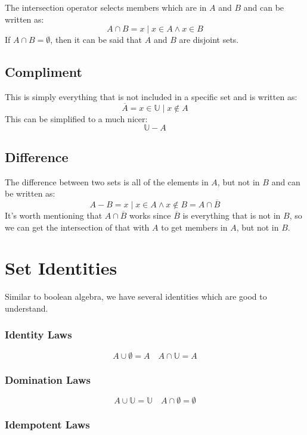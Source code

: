 The intersection operator selects members which are in \(A\) and \(B\) and can be written as:
\[
    A \cap B = {x \mid x \in A \land x \in B}
\]
If \(A \cap B= \emptyset\), then it can be said that \(A\) and \(B\) are disjoint sets.

\subsection{Compliment}\label{sub:compliment}

This is simply everything that is not included in a specific set and is written as:
\[
    \overline{A}={x \in \mathbb{U} \mid x \notin A}
\]
This can be simplified to a much nicer:
\[
    \mathbb{U}-A
\]

\subsection{Difference}\label{sub:differencepafour}

The difference between two sets is all of the elements in \(A\), but not in \(B\) and can be written as:
\[
    A-B = {x \mid x \in A \land x \notin B} = A \cap \overline{B}
\]
It's worth mentioning that \(A \cap \overline{B}\) works since \(\overline{B}\) is everything that is not in \(B\), so we can get the intersection of that with \(A\) to get members in \(A\), but not in \(B\).

\section{Set Identities}\label{sec:set_identities}

Similar to boolean algebra, we have several identities which are good to understand.

\subsubsection{Identity Laws}\label{ssub:identity_laws}

\[
    A \cup \emptyset = A \quad A \cap \mathbb{U} = A
\]

\subsubsection{Domination Laws}\label{ssub:domination_laws}

\[
    A \cup \mathbb{U} = \mathbb{U} \quad A \cap \emptyset = \emptyset
\]

\subsubsection{Idempotent Laws}\label{ssub:idempotent_laws}

